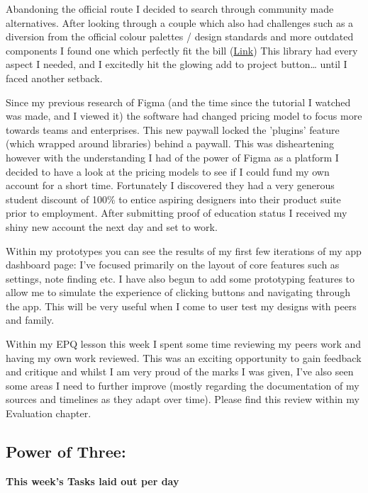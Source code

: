 Abandoning the official route I decided to search through community made alternatives. After looking through a couple which also had challenges such as a diversion from the official colour palettes / design standards and more outdated components I found one which perfectly fit the bill (\href{https://www.figma.com/design/JgunNpiqpurqV1ANxtD466/shadcn-ui-component-library--Community---Copy-?node-id=112-11267}{Link}) This library had every aspect I needed, and I excitedly hit the glowing add to project button… until I faced another setback.

Since my previous research of Figma (and the time since the tutorial I watched was made, and I viewed it) the software had changed pricing model to focus more towards teams and enterprises. This new paywall locked the 'plugins' feature (which wrapped around libraries) behind a paywall. This was disheartening however with the understanding I had of the power of Figma as a platform I decided to have a look at the pricing models to see if I could fund my own account for a short time. Fortunately I discovered they had a very generous student discount of 100\% to entice aspiring designers into their product suite prior to employment. After submitting proof of education status I received my shiny new account the next day and set to work.

Within my prototypes you can see the results of my first few iterations of my app dashboard page: I've focused primarily on the layout of core features such as settings, note finding etc. I have also begun to add some prototyping features to allow me to simulate the experience of clicking buttons and navigating through the app. This will be very useful when I come to user test my designs with peers and family.

Within my EPQ lesson this week I spent some time reviewing my peers work and having my own work reviewed. This was an exciting opportunity to gain feedback and critique and whilst I am very proud of the marks I was given, I've also seen some areas I need to further improve (mostly regarding the documentation of my sources and timelines as they adapt over time). Please find this review within my Evaluation chapter.

\subsection*{Power of Three:}
\textbf{This week's Tasks laid out per day}

